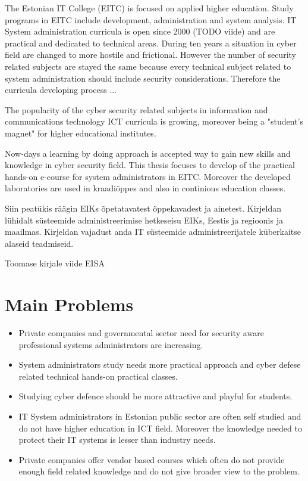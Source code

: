 The Estonian IT College (\gls{EITC}) is focused on applied higher education. Study programs in \gls{EITC} include development, administration and system analysis. IT System administration curricula is open since 2000 {\color{red}(TODO viide)} and are practical and dedicated to technical areas. During ten years a situation in cyber field are changed to more hostile and frictional. However the number of security related subjects are stayed the same because every technical subject related to system administration should include security considerations. Therefore the curricula developing process ...


The popularity of the cyber security related subjects in information and communications technology \gls{ICT} curricula is growing, moreover being a "student's magnet" for higher educational institutes.\citep{CyberIsHot}

Now-days a learning by doing approach is accepted way to gain new skills and knowledge in cyber security field. This thesis focuses to develop of the practical hands-on e-course for system administrators in \gls{EITC}. Moreover the developed laboratories are used in kraadiõppes and also in continious education classes.



Siin peatükis räägin EIKs õpetatavatest õppekavadest ja ainetest. Kirjeldan lühidalt süsteemide administreerimise hetkeseisu EIKs, Eestis ja regioonis ja maailmas. Kirjeldan vajadust anda IT süsteemide administreerijatele küberkaitse alaseid teadmiseid.





Toomase kirjale viide \gls{EISA}


\section{Main Problems}
\begin{itemize}
\item Private companies and governmental sector need for security aware professional systems administrators are increasing.
\item System administrators study needs more practical approach and cyber defese related technical hands-on practical classes.
\item Studying cyber defence should be more attractive and playful for students.
\item IT System administrators in Estonian public sector are often self studied  and do not have higher education in ICT field. Moreover the knowledge needed to protect their IT systems is lesser than industry needs.
\item Private companies offer vendor based courses which often do not provide enough field related knowledge and do not give broader view to the problem.
\end{itemize}

